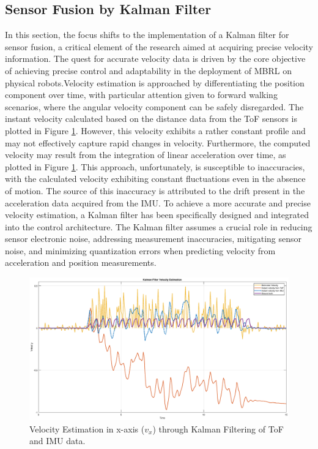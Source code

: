 \subsection{Sensor Fusion by Kalman Filter}
In this section, the focus shifts to the implementation of a Kalman filter for sensor fusion, a critical element of the research aimed at acquiring precise velocity information. The quest for accurate velocity data is driven by the core objective of achieving precise control and adaptability in the deployment of MBRL on physical robots.Velocity estimation is approached by differentiating the position component over time, with particular attention given to forward walking scenarios, where the angular velocity component can be safely disregarded. The instant velocity calculated based on the distance data from the ToF sensors is plotted in Figure \ref{fig:KF}. However, this velocity exhibits a rather constant profile and may not effectively capture rapid changes in velocity. Furthermore, the computed velocity may result from the integration of linear acceleration over time, as plotted in Figure \ref{fig:KF}. This approach, unfortunately, is susceptible to inaccuracies, with the calculated velocity exhibiting constant fluctuations even in the absence of motion. The source of this inaccuracy is attributed to the drift present in the acceleration data acquired from the IMU. To achieve a more accurate and precise velocity estimation, a Kalman filter has been specifically designed and integrated into the control architecture. The Kalman filter assumes a crucial role in reducing sensor electronic noise, addressing measurement inaccuracies, mitigating sensor noise, and minimizing quantization errors when predicting velocity from acceleration and position measurements.
\begin{figure}[htb]
    \centering
    \includegraphics[width=0.9\linewidth]{img/chap4/KF.eps}
    \caption{Velocity Estimation in x-axis ($v_x$) through Kalman Filtering of ToF and IMU data.}
    \label{fig:KF}
\end{figure}

